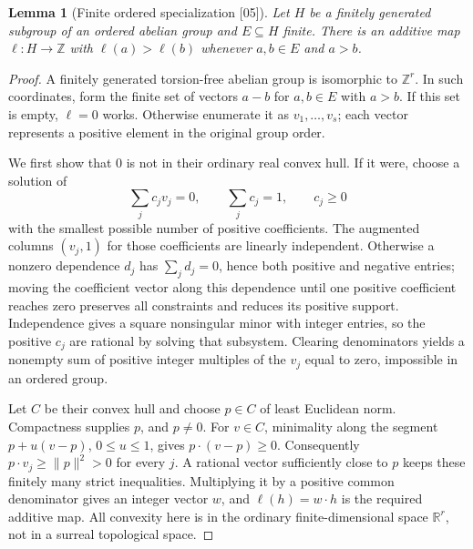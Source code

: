 \documentclass[11pt,oneside]{article}
\numberwithin{equation}{section}
\newtheorem{lemma}[lemma]{Lemma}
\theoremstyle{definition}
\theoremstyle{remark}
\newcommand{\Z}{\mathbb Z}
\newcommand{\R}{\mathbb R}
\newcommand{\src}[1]{\textup{\textsf{\small[#1]}}}
\begin{document}
\begin{lemma}[Finite ordered specialization \src{05}]\label{odg:lem:specialization}
Let $H$ be a finitely generated subgroup of an ordered abelian group and
$E\subseteq H$ finite. There is an additive map $\ell:H\to\Z$ with
$\ell(a)>\ell(b)$ whenever $a,b\in E$ and $a>b$.
\end{lemma}
\begin{proof}
A finitely generated torsion-free abelian group is isomorphic to $\Z^r$. In
such coordinates, form the finite set of vectors $a-b$ for $a,b\in E$ with
$a>b$. If this set is empty, $\ell=0$ works. Otherwise enumerate it as
$v_1,\ldots,v_s$; each vector represents a positive element in the original
group order.

We first show that $0$ is not in their ordinary real convex hull. If it
were, choose a solution of
\[
 \sum_j c_jv_j=0,\qquad \sum_j c_j=1,\qquad c_j\ge0
\]
with the smallest possible number of positive coefficients. The augmented
columns $(v_j,1)$ for those coefficients are linearly independent. Otherwise
a nonzero dependence $d_j$ has $\sum_j d_j=0$, hence both positive and
negative entries; moving the coefficient vector along this dependence
until one positive coefficient reaches zero preserves all constraints and
reduces its positive support. Independence gives a square nonsingular
minor with integer entries, so the positive $c_j$ are rational by solving
that subsystem. Clearing denominators yields a nonempty sum of positive
integer multiples of the $v_j$ equal to zero, impossible in an ordered group.

Let $C$ be their convex hull and choose $p\in C$ of least Euclidean norm.
Compactness supplies $p$, and $p\ne0$. For $v\in C$, minimality along the
segment $p+u(v-p)$, $0\le u\le1$, gives
$p\mathbin{\cdot}(v-p)\ge0$. Consequently
$p\mathbin{\cdot}v_j\ge\|p\|^2>0$ for every $j$.
A rational vector sufficiently close to $p$ keeps these finitely many
strict inequalities. Multiplying it by a positive common denominator
gives an integer vector $w$, and $\ell(h)=w\mathbin{\cdot}h$ is the required
additive map. All convexity here is in the ordinary finite-dimensional
space $\R^r$, not in a surreal topological space.
\end{proof}
\end{document}
